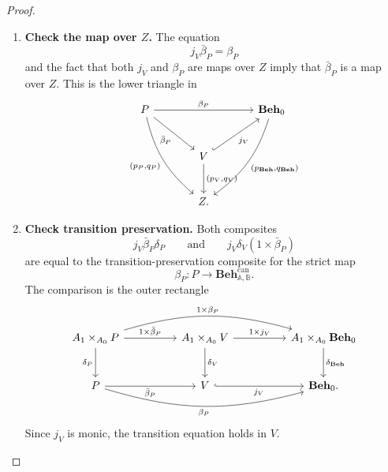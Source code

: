 \begin{proof}
    \leavevmode
    \begin{enumerate}
        \item \textbf{Check the map over \(Z\).}
        The equation
        \[
            j_V\bar\beta_P=\beta_P
        \]
        and the fact that both \(j_V\) and \(\beta_P\) are maps over \(Z\)
        imply that \(\bar\beta_P\) is a map over \(Z\). This is the lower
        triangle in
        \[
        \begin{tikzcd}[column sep=large, row sep=large]
            P
                \arrow[rr, "\beta_P"]
                \arrow[dr, "\bar\beta_P"']
                \arrow[ddr, "{(p_P,q_P)}"', bend right=18]
            &&
            \mathbf{Beh}_0
                \arrow[ddl, "{(p_{\mathbf{Beh}},q_{\mathbf{Beh}})}", bend left=18]
            \\
            &
            V
                \arrow[ur, hook, "j_V"']
                \arrow[d, "{(p_V,q_V)}"]
            &
            \\
            &
            Z .
        \end{tikzcd}
        \]

        \item \textbf{Check transition preservation.}
        Both composites
        \[
            j_V\bar\beta_P\delta_P
            \qquad\text{and}\qquad
            j_V\delta_V(1\times\bar\beta_P)
        \]
        are equal to the transition-preservation composite for the strict map
        \[
            \beta_P:P\to\mathbf{Beh}^{\mathrm{can}}_{\mathbb A,\mathbb B}.
        \]
        The comparison is the outer rectangle
        \[
        \begin{tikzcd}[column sep=huge, row sep=large]
            A_1\times_{A_0}P
                \arrow[r, "{1\times \bar\beta_P}"]
                \arrow[d, "\delta_P"']
                \arrow[rr, bend left=16, "{1\times \beta_P}"]
            &
            A_1\times_{A_0}V
                \arrow[r, "{1\times j_V}"]
                \arrow[d, "\delta_V"]
            &
            A_1\times_{A_0}\mathbf{Beh}_0
                \arrow[d, "\delta_{\mathbf{Beh}}"]
            \\
            P
                \arrow[r, "\bar\beta_P"']
                \arrow[rr, bend right=16, "\beta_P"']
            &
            V
                \arrow[r, hook, "j_V"']
            &
            \mathbf{Beh}_0 .
        \end{tikzcd}
        \]
        Since \(j_V\) is monic, the transition equation holds in \(V\).


\end{enumerate}
\end{proof}
